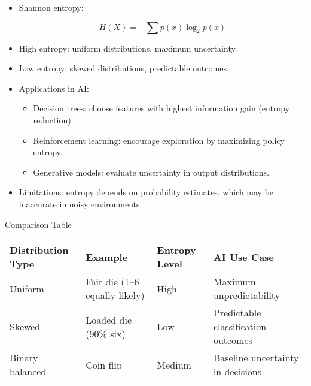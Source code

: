 \documentclass[
  letterpaper,
  DIV=11,
  numbers=noendperiod]{scrreprt}
\providecommand{\tightlist}{%
  \setlength{\itemsep}{0pt}\setlength{\parskip}{0pt}}
\begin{document}
\begin{itemize}
\item
  Shannon entropy:

  \[
  H(X) = -\sum p(x) \log_2 p(x)
  \]
\item
  High entropy: uniform distributions, maximum uncertainty.
\item
  Low entropy: skewed distributions, predictable outcomes.
\item
  Applications in AI:

  \begin{itemize}
  \tightlist
  \item
    Decision trees: choose features with highest information gain
    (entropy reduction).
  \item
    Reinforcement learning: encourage exploration by maximizing policy
    entropy.
  \item
    Generative models: evaluate uncertainty in output distributions.
  \end{itemize}
\item
  Limitations: entropy depends on probability estimates, which may be
  inaccurate in noisy environments.
\end{itemize}

Comparison Table

\begin{longtable}[]{@{}
  >{\raggedright\arraybackslash}p{}
  >{\raggedright\arraybackslash}p{}
  >{\raggedright\arraybackslash}p{}
  >{\raggedright\arraybackslash}p{}@{}}
\toprule\noalign{}
\begin{minipage}[b]{\linewidth}\raggedright
Distribution Type
\end{minipage} & \begin{minipage}[b]{\linewidth}\raggedright
Example
\end{minipage} & \begin{minipage}[b]{\linewidth}\raggedright
Entropy Level
\end{minipage} & \begin{minipage}[b]{\linewidth}\raggedright
AI Use Case
\end{minipage} \\
\midrule\noalign{}
\endhead
\bottomrule\noalign{}
\endlastfoot
Uniform & Fair die (1--6 equally likely) & High & Maximum
unpredictability \\
Skewed & Loaded die (90\% six) & Low & Predictable classification
outcomes \\
Binary balanced & Coin flip & Medium & Baseline uncertainty in
decisions \\
\end{longtable}
\end{document}
